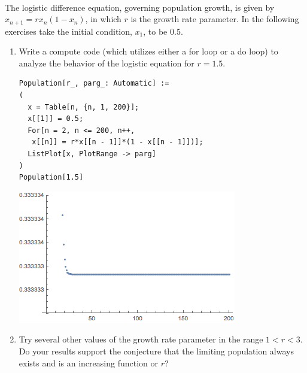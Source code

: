 \documentclass{hw}
\begin{document}
\makeheader{}
\noindent\\

The logistic difference equation, governing population growth, is given by $x_{n+1}=rx_{n}(1-x_{n})$, in which
$r$ is the growth rate parameter. In the following exercises take the initial condition, $x_{1}$, to be
0.5.

\begin{enumerate}
\item Write a compute code (which utilizes either a for loop or a do loop) to analyze the behavior of the
logistic equation for $r=1.5$.

\vspace{0.5cm}

\begin{minipage}{0.5\textwidth}
\begin{verbatim}
Population[r_, parg_: Automatic] :=
(
  x = Table[n, {n, 1, 200}];
  x[[1]] = 0.5;
  For[n = 2, n <= 200, n++,
   x[[n]] = r*x[[n - 1]]*(1 - x[[n - 1]])];
  ListPlot[x, PlotRange -> parg]
)
Population[1.5]
\end{verbatim}
\end{minipage}
\begin{minipage}{0.5\textwidth}
\centering
\includegraphics[scale=0.5]{p15}
\end{minipage}

\item Try several other values of the growth rate parameter in the range $1<r<3$. Do your results support
the conjecture that the limiting population always exists and is an increasing function or $r$?

\vspace{0.5cm}


\end{enumerate}
\end{document}
